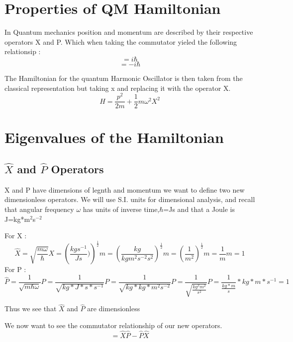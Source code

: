 \documentclass{article}
\newcommand{\be}{\begin{equation}}
\newcommand{\ee}{\end{equation}}
\begin{document}
\section{Properties of QM Hamiltonian}
In Quantum mechanics position and momentum are described by their respective operators X and P. 
Which when taking the commutator yieled the following relationsip : 
\be
[X,P]=i\hbar
\ee
\be
[P,X]=-i\hbar
\ee

The Hamiltonian for the quantum Harmonic Oscillator is then taken from the classical representation but taking x and replacing it with the operator X.
\be
H=\frac{p^2}{2m} + \frac{1}{2}m\omega^2X^2
\ee
\section{Eigenvalues of the Hamiltonian}

\subsection{$\hat{X}$ and $\hat{P}$ Operators}

X and P have dimensions of legnth and momentum we want to define two new dimensionless operators. We will use S.I. units for dimensional analysis, and recall that angular frequency $\omega$  has units of inverse time,$\hbar$=Js and that a Joule is J=kg*m$^2$s$^{-2}$

For X : 
\be
\hat{X}=\sqrt{\frac{m\omega}{\hbar}}X=\left(\frac{kgs^{-1}}{Js})\right)^{\frac{1}{2}}m = \left(\frac{kg}{kgm^{2}s^{-2}s^{2}}\right)^{\frac{1}{2}}m = \left(\frac{1}{m^2}\right)^{\frac{1}{2}} m = \frac{1}{m}m = 1
\ee
For P : 
\be
\hat{P} = \frac{1}{\sqrt{m\hbar \omega}} P = \frac{1}{\sqrt{kg *J*s*s^{-1}}} P = \frac{1}{\sqrt{kg*kg*m^2s^{-2}}} P = \frac{1}{\sqrt{\frac{kg^2m^2}{s^2}}} P = \frac{1}{\frac{kg*m}{s}}*kg*m*s^{-1} = 1
\ee

Thus we see that $\hat{X}$ and $\hat{P}$ are dimensionless

We now want to see the commutator relationship of our new operators. 
\be
[\hat{X},\hat{P}] = \hat{X}\hat{P} - \hat{P}\hat{X}
\ee
\end{document}
